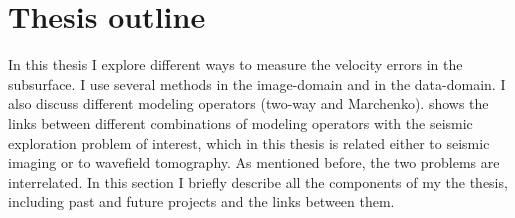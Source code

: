 \newpage
\section{Thesis outline}


In this thesis I explore different ways to measure the velocity errors in the subsurface. I 
use several methods in the image-domain and in the data-domain. I also discuss different
modeling operators (two-way and Marchenko).  shows the links between different
combinations of modeling operators with the seismic exploration problem of interest, which
in this thesis is related either to seismic imaging or to wavefield tomography. As 
mentioned before, the two problems are interrelated. In this section I briefly 
describe all the components of my the thesis, including 
past and future projects and the links between them. 

